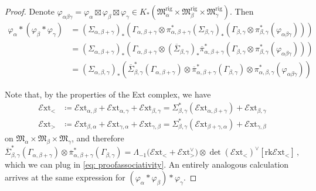 \documentclass[10pt,a4paper]{amsart}
\newcommand{\Ext}{\mathcal{E}\text{xt}}
\newcommand{\FM}{{\mathfrak{M}}}
\newcommand{\rig}{\mathrm{rig}}
\newcommand{\rk}{\mathrm{rk}}
\begin{document}
\begin{proof}
Denote $\varphi_{\alpha\beta\gamma}=\varphi_\alpha\boxtimes\varphi_\beta\boxtimes \varphi_\gamma\in K_\ast(\FM_\alpha^\rig\times \FM_\beta^\rig\times \FM_\gamma^\rig)$. Then
\begin{align}\label{eq: proofassociativity}
    \varphi_\alpha\ast(\varphi_\beta\ast \varphi_\gamma)&=(\Sigma_{\alpha, \beta+\gamma})_\ast\left(\Gamma_{\alpha, \beta+\gamma}\otimes \pi_{\alpha, \beta+\gamma}^\ast(\Sigma_{\beta, \gamma})_\ast\left(\Gamma_{\beta, \gamma}\otimes \pi_{\beta, \gamma}^\ast(\varphi_{\alpha\beta\gamma})\right)\right)\\
    &\nonumber =(\Sigma_{\alpha, \beta+\gamma})_\ast\left(\Gamma_{\alpha, \beta+\gamma}\otimes (\overline\Sigma_{\beta, \gamma})_\ast\overline\pi_{\alpha, \beta+\gamma}^\ast\left(\Gamma_{\beta, \gamma}\otimes \pi_{\beta, \gamma}^\ast(\varphi_{\alpha\beta\gamma})\right)\right)\\
    &\nonumber =(\Sigma_{\alpha, \beta, \gamma})_\ast \left(\overline \Sigma_{\beta, \gamma}^\ast(\Gamma_{\alpha, \beta+\gamma})\otimes \overline\pi_{\alpha, \beta+\gamma}^\ast(\Gamma_{\beta, \gamma})\otimes \pi_{\alpha, \beta, \gamma}^\ast(\varphi_{\alpha\beta\gamma})\right)
\end{align}

Note that, by the properties of the Ext complex, we have
\begin{align*}\Ext_{<}&\coloneqq \Ext_{\alpha, \beta}+\Ext_{\alpha, \gamma}+\Ext_{\beta, \gamma}=\Sigma_{\beta,\gamma}^\ast(\Ext_{\alpha, \beta+\gamma})+\Ext_{\beta, \gamma}\\
\Ext_{>}&\coloneqq \Ext_{\beta, \alpha}+\Ext_{\gamma, \alpha}+\Ext_{\gamma, \beta}=\Sigma_{\beta,\gamma}^\ast(\Ext_{\beta+\gamma, \alpha})+\Ext_{ \gamma, \beta}
\end{align*}
on $\FM_{\alpha}\times \FM_\beta\times \FM_\gamma$, and therefore
\[\overline \Sigma_{\beta, \gamma}^\ast(\Gamma_{\alpha, \beta+\gamma})\otimes \overline\pi_{\alpha, \beta+\gamma}^\ast(\Gamma_{\beta, \gamma})=\Lambda_{-1}\big(\Ext_{<}+\Ext_{>}^\vee\big)\otimes \det(\Ext_{<})^\vee[\rk \Ext_{<}]\,,\]
which we can plug in \eqref{eq: proofassociativity}. An entirely analogous calculation arrives at the same expression for $(\varphi_\alpha\ast \varphi_\beta)\ast \varphi_\gamma$. 
\end{proof}
\end{document}
